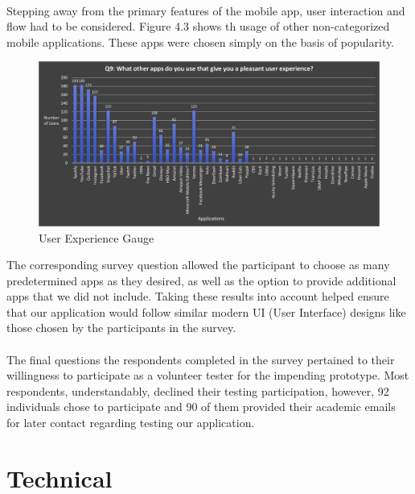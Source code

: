 \paragraph{}
 Stepping away from the primary features of the mobile app, user interaction and flow had to be considered. Figure 4.3 shows th usage of other non-categorized mobile applications. These apps were chosen simply on the basis of popularity. 
 
 \begin{figure}[H]
        \centering
        \includegraphics[width = \textwidth, height = \textheight, keepaspectratio]{assets/img/Student Survey Results Q9.png}
         \caption{User Experience Gauge}
    \end{figure}
    
The corresponding survey question allowed the participant to choose as many predetermined apps as they desired, as well as the option to provide additional apps that we did not include. Taking these results into account helped ensure that our application would follow similar modern UI (User Interface) designs like those chosen by the participants in the survey.

\paragraph{}
The final questions the respondents completed in the survey pertained to their willingness to participate as a volunteer tester for the impending prototype. Most respondents, understandably, declined their testing participation, however, 92 individuals chose to participate and 90 of them provided their academic emails for later contact regarding testing our application.

\section{Technical}

